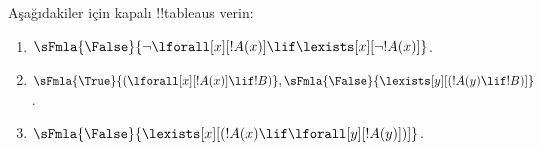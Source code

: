 \documentclass[../../../include/open-logic-section]{subfiles}
\begin{document}
\begin{prob}
Aşağıdakiler için kapalı !!{tableau}s verin:
\begin{enumerate}
\item $\sFmla{\False}{\lnot\lforall[x][!A(x)] \lif \lexists[x][\lnot!A(x)]}$.
\item $\sFmla{\True}{(\lforall[x][!A(x)] \lif !B)}, \sFmla{\False}{\lexists[y][(!A(y) \lif !B)]}$.
\item $\sFmla{\False}{\lexists[x][(!A(x) \lif \lforall[y][!A(y)])]}$.
\end{enumerate}
\end{prob}
\end{document}
